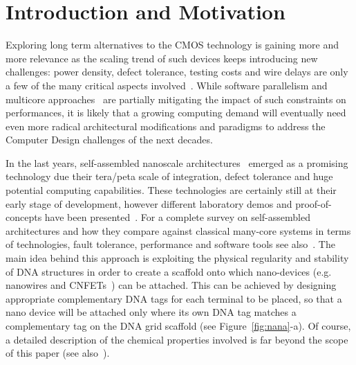 
\section{Introduction and Motivation}
\label{sec:introduction}

Exploring long term alternatives to the CMOS technology is gaining
more and more relevance as the scaling trend of such devices keeps
introducing new challenges: power density, defect tolerance, testing
costs and wire delays are only a few of the many critical aspects
involved~\cite{itrs13}. 
While software parallelism and multicore
approaches~\cite{horowitz2004,powell2009} are partially mitigating the impact of such
constraints on performances, it is likely that a growing computing demand will
eventually need even more radical architectural modifications and 
paradigms to address the Computer Design challenges of the next
decades.

In the last years, self-assembled nanoscale
architectures~\cite{yan2003} emerged as a promising technology due
their tera/peta scale of integration, defect tolerance and huge
potential computing capabilities. These technologies are certainly
still at their early stage of development, however different
laboratory demos and proof-of-concepts have been
presented~\cite{patwardhan2004, patwardhan2006, patwardhan2006_1,
pistol2009}. For a complete survey on self-assembled architectures and
how they compare against classical many-core systems in terms of
 technologies, fault tolerance, performance and software tools see
 also~\cite{Future}.
The main idea behind this approach is exploiting the physical
regularity and stability of DNA structures in order to create a
scaffold onto which nano-devices (e.g. nanowires and
CNFETs~\cite{bachtold2001, tans1998, cui2001}) can be attached. This
can be achieved by designing appropriate complementary DNA tags for
each terminal to be placed, so that a nano device will be attached
only where its own DNA tag matches a complementary tag on the DNA grid
scaffold (see Figure~\ref{fig:nana}-a).  Of course, a detailed
description of the chemical properties involved is far beyond the
scope of this paper (see also~\cite{braun1998, seeman1999}). 

